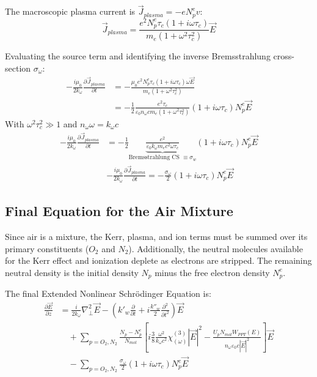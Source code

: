 \documentclass[11pt,a4paper]{article}
\begin{document}
The macroscopic plasma current is $\vec{J}_{plasma} = -e N_p^e v$:
\begin{equation}
\vec{J}_{plasma} = \frac{e^2 N_p^e \tau_c (1 + i \omega \tau_c)}{m_e (1 + \omega^2 \tau_c^2)}\vec{E}
\end{equation}

Evaluating the source term and identifying the inverse Bremsstrahlung cross-section $\sigma_{\omega}$:
\begin{align}
- \frac{i \mu_0}{2 k_{\omega}} \frac{\partial \vec{J}_{plasma}}{\partial t} &= - \frac{\mu_0 e^2 N_p^e \tau_c (1 + i \omega \tau_c) \omega \vec{E}}{m_e (1 + \omega^2 \tau_c^2)} \nonumber \\
&= - \frac{1}{2} \frac{e^2 \tau_c}{\varepsilon_0 n_{\omega} c m_e (1 + \omega^2 \tau_c^2)} (1 + i \omega \tau_c) N_p^e \vec{E}
\end{align}
With $\omega^2\tau_c^2 \gg 1$ and $n_{\omega}\omega = k_{\omega}c$
\begin{align}
- \frac{i \mu_0}{2 k_{\omega}} \frac{\partial \vec{J}_{plasma}}{\partial t} &= - \frac{1}{2} \underbrace{\frac{e^2}{\varepsilon_0 k_{\omega} m_e c^2 \omega \tau_c}}_{\text{Bremsstrahlung CS } \equiv \sigma_w} (1 + i \omega \tau_c) N_p^e \vec{E}\\
&- \frac{i \mu_0}{2 k_{\omega}} \frac{\partial \vec{J}_{plasma}}{\partial t}= - \frac{\sigma_{\omega}}{2} (1 + i \omega \tau_c) N_p^e \vec{E}
\end{align}


\subsection*{Final Equation for the Air Mixture}
Since air is a mixture, the Kerr, plasma, and ion terms must be summed over its primary constituents ($O_2$ and $N_2$). Additionally, the neutral molecules available for the Kerr effect and ionization deplete as electrons are stripped. The remaining neutral density is the initial density $N_p$ minus the free electron density $N_p^e$.

The final Extended Nonlinear Schrödinger Equation is:
\begin{align}
\frac{\partial \vec{E}}{\partial z} &= \frac{i}{2 k_{\omega}} \nabla_\perp^2 \vec{E} - \left( k'_w \frac{\partial}{\partial t} + i \frac{k''_w}{2} \frac{\partial^2}{\partial t^2} \right) \vec{E} \nonumber \\
&\quad + \sum_{p=O_2, N_2} \frac{N_p - N_p^e}{N_{mol}} \left[ i \frac{3}{8} \frac{\omega^2}{k_{\omega} c^2} \chi^{(3)}_{(\omega)} |\vec{E}|^2 - \frac{U_p N_{mol} W_{PPT}(E)}{n_{\omega} \varepsilon_0 c |\vec{E}|^2} \right] \vec{E} \nonumber \\
&\quad - \sum_{p=O_2, N_2} \frac{\sigma_{\omega}}{2} (1 + i \omega \tau_c) N_p^e \vec{E}
\end{align}
\end{document}
